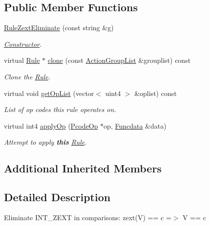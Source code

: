 \subsection*{Public Member Functions}
\begin{DoxyCompactItemize}
\item 
\mbox{\hyperlink{class_rule_zext_eliminate_aded01c393e5d650e7e3a3bee3d1485dc}{Rule\+Zext\+Eliminate}} (const string \&g)
\begin{DoxyCompactList}\small\item\em \mbox{\hyperlink{class_constructor}{Constructor}}. \end{DoxyCompactList}\item 
virtual \mbox{\hyperlink{class_rule}{Rule}} $\ast$ \mbox{\hyperlink{class_rule_zext_eliminate_aa695ebff0d43a28e791e03bbfaf792b7}{clone}} (const \mbox{\hyperlink{class_action_group_list}{Action\+Group\+List}} \&grouplist) const
\begin{DoxyCompactList}\small\item\em Clone the \mbox{\hyperlink{class_rule}{Rule}}. \end{DoxyCompactList}\item 
virtual void \mbox{\hyperlink{class_rule_zext_eliminate_ada5f7ed4da2939db43d55c3982702d11}{get\+Op\+List}} (vector$<$ uint4 $>$ \&oplist) const
\begin{DoxyCompactList}\small\item\em List of op codes this rule operates on. \end{DoxyCompactList}\item 
virtual int4 \mbox{\hyperlink{class_rule_zext_eliminate_a06205a6c85cac93cf2ef1de9e8fc93ff}{apply\+Op}} (\mbox{\hyperlink{class_pcode_op}{Pcode\+Op}} $\ast$op, \mbox{\hyperlink{class_funcdata}{Funcdata}} \&data)
\begin{DoxyCompactList}\small\item\em Attempt to apply {\bfseries{this}} \mbox{\hyperlink{class_rule}{Rule}}. \end{DoxyCompactList}\end{DoxyCompactItemize}
\subsection*{Additional Inherited Members}


\subsection{Detailed Description}
Eliminate I\+N\+T\+\_\+\+Z\+E\+XT in comparisons\+: {\ttfamily zext(\+V) == c =$>$ V == c} 

